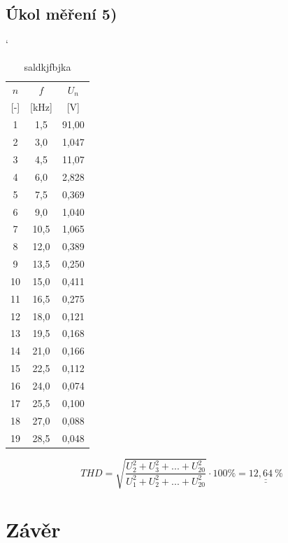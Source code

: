 \documentclass[a4paper, czech]{article}
\begin{document}
\subsection{Úkol měření 5)}

\begin{table}[H]
    \catcode`
    \centering
    \caption{saldkjfbjka}
    \begin{tabular}{ccc}
        \toprule
        $n$       & $f$         & $U_n$      \\
        \cmidrule(rl){1-3}
        [-]       & [kHz]       & [V]        \\
        \midrule
        1         & 1,5         & 91,00      \\
        2         & 3,0         & 1,047      \\
        3         & 4,5         & 11,07      \\
        4         & 6,0         & 2,828      \\
        5         & 7,5         & 0,369      \\
        6         & 9,0         & 1,040      \\
        7         & 10,5        & 1,065      \\
        8         & 12,0        & 0,389      \\
        9         & 13,5        & 0,250      \\
        10        & 15,0        & 0,411      \\
        11        & 16,5        & 0,275      \\
        12        & 18,0        & 0,121      \\
        13        & 19,5        & 0,168      \\
        14        & 21,0        & 0,166      \\
        15        & 22,5        & 0,112      \\
        16        & 24,0        & 0,074      \\
        17        & 25,5        & 0,100      \\
        18        & 27,0        & 0,088      \\
        19        & 28,5        & 0,048      \\
        \bottomrule
    \end{tabular}
\end{table}

\begin{equation*}
    THD = \sqrt{\frac{U_2^2 + U_3^2 + ... + U_{20}^2}{U_1^2 + U_2^2 + ... + U_{20}^2}} \cdot 100 \% = \underline{\underline{12,64\ \%}}
\end{equation*}

\section{Závěr}
\end{document}
